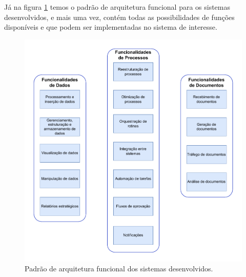 	Já na figura \ref{fig:metodologia:arquiteturaFuncional} temos o padrão de arquitetura funcional para os sistemas desenvolvidos, e mais uma vez, contém todas as possibilidades
	de funções disponíveis e que podem ser implementadas no sistema de interesse.
	\begin{figure}[h]
		\centering
		\includegraphics[width=1\textwidth]{./figuras/arquiteturaFuncional.pdf}
		\caption{Padrão de arquitetura funcional dos sistemas desenvolvidos.}
		\label{fig:metodologia:arquiteturaFuncional}
	\end{figure}